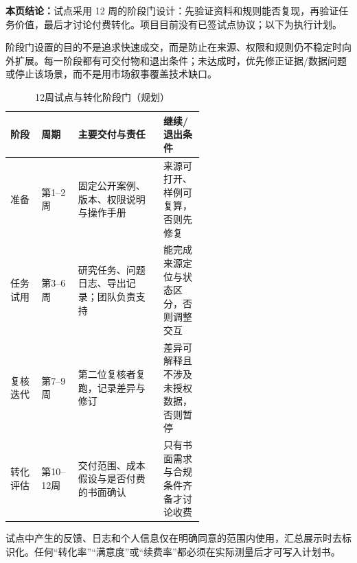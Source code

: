 \textbf{本页结论：}试点采用 12 周的阶段门设计：先验证资料和规则能否复现，再验证任务价值，最后才讨论付费转化。项目目前没有已签试点协议；以下为执行计划。

阶段门设置的目的不是追求快速成交，而是防止在来源、权限和规则仍不稳定时向外扩展。每一阶段都有可交付物和退出条件；未达成时，优先修正证据/数据问题或停止该场景，而不是用市场叙事覆盖技术缺口。

\begin{table}[htbp]
\centering
\caption{12周试点与转化阶段门（规划）}
\label{tab:wty-pilot-plan}
\small
\begin{tabularx}{\linewidth}{p{0.16\linewidth}p{0.19\linewidth}X p{0.21\linewidth}}
\toprule
阶段 & 周期 & 主要交付与责任 & 继续/退出条件 \\
\midrule
准备 & 第1--2周 & 固定公开案例、版本、权限说明与操作手册 & 来源可打开、样例可复算，否则先修复 \\
任务试用 & 第3--6周 & 研究任务、问题日志、导出记录；团队负责支持 & 能完成来源定位与状态区分，否则调整交互 \\
复核迭代 & 第7--9周 & 第二位复核者复跑，记录差异与修订 & 差异可解释且不涉及未授权数据，否则暂停 \\
转化评估 & 第10--12周 & 交付范围、成本假设与是否付费的书面确认 & 只有书面需求与合规条件齐备才讨论收费 \\
\bottomrule
\end{tabularx}
\end{table}

试点中产生的反馈、日志和个人信息仅在明确同意的范围内使用，汇总展示时去标识化。任何“转化率”“满意度”或“续费率”都必须在实际测量后才可写入计划书。
